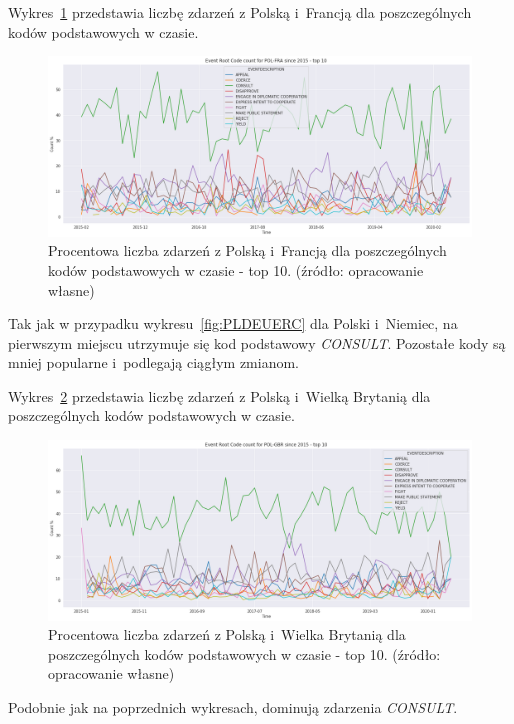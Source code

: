 \documentclass[11pt]{report}
\begin{document}
    Wykres~\ref{fig:PLFRAERC} przedstawia liczbę zdarzeń z Polską i~Francją dla poszczególnych kodów podstawowych w czasie.
    \begin{figure}[!htp]
        \centering
        \includegraphics[width=\linewidth]{fig/PL/POLFRAERCperc.png}
        \caption{Procentowa liczba zdarzeń z Polską i~Francją dla poszczególnych kodów podstawowych w czasie - top 10. (źródło: opracowanie własne)}
        \label{fig:PLFRAERC}
    \end{figure}
    Tak jak w przypadku wykresu~\ref{fig:PLDEUERC} dla Polski i~Niemiec, na pierwszym miejscu utrzymuje się kod podstawowy \textit{CONSULT}.
    Pozostałe kody są mniej popularne i~podlegają ciągłym zmianom.

    Wykres~\ref{fig:PLGBRERC} przedstawia liczbę zdarzeń z Polską i~Wielką Brytanią dla poszczególnych kodów podstawowych w czasie.
    \begin{figure}[!htp]
        \centering
        \includegraphics[width=\linewidth]{fig/PL/POLGBRERCperc.png}
        \caption{Procentowa liczba zdarzeń z Polską i~Wielka Brytanią dla poszczególnych kodów podstawowych w czasie - top 10. (źródło: opracowanie własne)}
        \label{fig:PLGBRERC}
    \end{figure}
    Podobnie jak na poprzednich wykresach, dominują zdarzenia \textit{CONSULT}.
\end{document}
